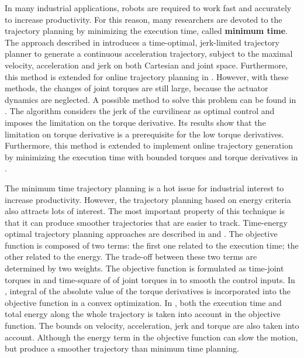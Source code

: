 In many industrial applications, robots are required to work fast and accurately to increase productivity. For this reason, many researchers are devoted to the trajectory planning by minimizing the execution time, called \textbf{minimum time}. The approach described in \cite{macfarlane2003,herrera2006} introduces a time-optimal, jerk-limited trajectory planner to generate a continuous acceleration trajectory, subject to the maximal velocity, acceleration and jerk on both Cartesian and joint space. Furthermore, this method is extended for online trajectory planning in \cite{haschke2008}. However, with these methods, the changes of joint torques are still large, because the actuator dynamics are neglected. A possible method to solve this problem can be found in \cite{costantinescu2000}. The algorithm considers the jerk of the curvilinear as optimal control and imposes the limitation on the torque derivative. Its results show that the limitation on torque derivative is a prerequisite for the low torque derivatives. Furthermore, this method is extended to implement online trajectory generation by minimizing the execution time with bounded torques and torque derivatives in \cite{gerelli2008}.


The minimum time trajectory planning is a hot issue for industrial interest to increase productivity. However, the trajectory planning based on energy criteria also attracts lots of interest. The most important property of this technique is that it can produce smoother trajectories that are easier to track. Time-energy optimal trajectory planning approaches are described in \cite{shiller1992} and \cite{shiller1996}. The objective function is composed of two terms: the first one related to the execution time; the other related to the energy. The trade-off between these two terms are determined by two weights. The objective function is formulated as time-joint torques in \cite{shiller1992} and time-square of of joint torques in \cite{balkan1998} to smooth the control inputs. In \cite{verscheure2008}, integral of the absolute value of the torque derivatives is incorporated into the objective function in a convex optimization. In \cite{xu2009}, both the execution time and total energy along the whole trajectory is taken into account in the objective function. The bounds on velocity, acceleration, jerk and torque are also taken into account. Although the energy term in the objective function can slow the motion, but produce a smoother trajectory than minimum time planning. 

